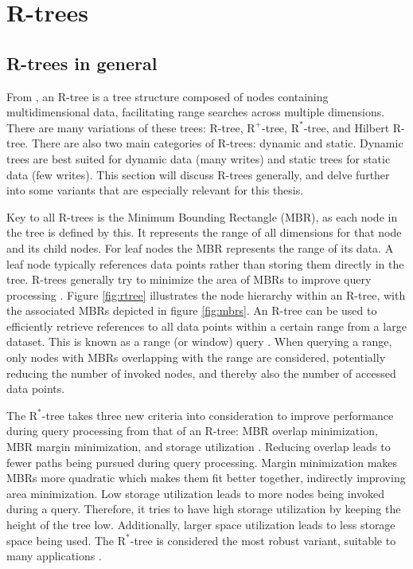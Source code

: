 \section{R-trees}
\label{sec:rtree}

\subsection{R-trees in general}
From \textcite{rtree}, an R-tree is a tree structure composed of nodes containing multidimensional data, facilitating range searches across multiple dimensions. There are many variations of these trees: R-tree, $\text{R}^+$-tree, $\text{R}^*$-tree, and Hilbert R-tree. There are also two main categories of R-trees: dynamic and static. Dynamic trees are best suited for dynamic data (many writes) and static trees for static data (few writes). This section will discuss R-trees generally, and delve further into some variants that are especially relevant for this thesis.

Key to all R-trees is the Minimum Bounding Rectangle (MBR), as each node in the tree is defined by this. It represents the range of all dimensions for that node and its child nodes. For leaf nodes the MBR represents the range of its data. A leaf node typically references data points rather than storing them directly in the tree. R-trees generally try to minimize the area of MBRs to improve query processing \cite{rtree}. Figure \ref{fig:rtree} illustrates the node hierarchy within an R-tree, with the associated MBRs depicted in figure \ref{fig:mbrs}. An R-tree can be used to efficiently retrieve references to all data points within a certain range from a large dataset. This is known as a range (or window) query \cite{rtree}. When querying a range, only nodes with MBRs overlapping with the range are considered, potentially reducing the number of invoked nodes, and thereby also the number of accessed data points.

The $\text{R}^*$-tree takes three new criteria into consideration to improve performance during query processing from that of an R-tree: MBR overlap minimization, MBR margin minimization, and storage utilization \cite{rtree}. Reducing overlap leads to fewer paths being pursued during query processing. Margin minimization makes MBRs more quadratic which makes them fit better together, indirectly improving area minimization. Low storage utilization leads to more nodes being invoked during a query. Therefore, it tries to have high storage utilization by keeping the height of the tree low. Additionally, larger space utilization leads to less storage space being used. The $\text{R}^*$-tree is considered the most robust variant, suitable to many applications \cite{rtree}.


